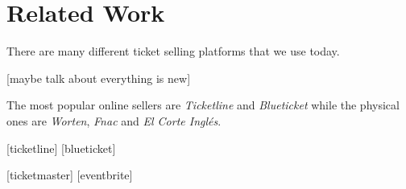 \section{Related Work}

There are many different ticket selling platforms that we use today.

    [maybe talk about everything is new]

The most popular online sellers are \emph{Ticketline} and \emph{Blueticket} while the physical ones are \emph{Worten}, \emph{Fnac} and \emph{El Corte Inglés}.

[ticketline]
[blueticket]

[ticketmaster]
[eventbrite]
